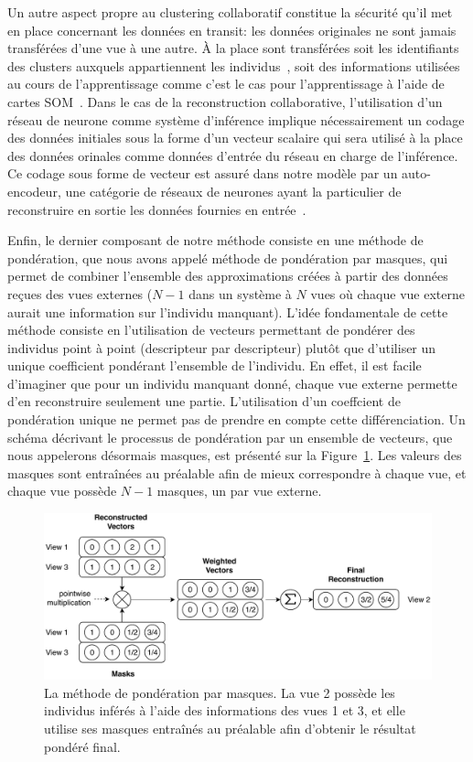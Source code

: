     Un autre aspect propre au clustering collaboratif constitue la sécurité qu'il met en place concernant les données en transit: les données originales ne sont jamais transférées d'une vue à une autre. À la place sont transférées soit les identifiants des clusters auxquels appartiennent les individus~\cite{sublime2016collaborative,Sublime2015}, soit des informations utilisées au cours de l'apprentissage comme c'est le cas pour l'apprentissage à l'aide de cartes SOM~\cite{ghassany2012collaborative,maurel2017incremental}. Dans le cas de la reconstruction collaborative, l'utilisation d'un réseau de neurone comme système d'inférence implique nécessairement un codage des données initiales sous la forme d'un vecteur scalaire qui sera utilisé à la place des données orinales comme données d'entrée du réseau en charge de l'inférence. Ce codage sous forme de vecteur est assuré dans notre modèle par un auto-encodeur, une catégorie de réseaux de neurones ayant la particulier de reconstruire en sortie les données fournies en entrée~\cite{vincent2008extracting}. 

    Enfin, le dernier composant de notre méthode consiste en une méthode de pondération, que nous avons appelé méthode de pondération par masques, qui permet de combiner l'ensemble des approximations créées à partir des données reçues des vues externes ($N-1$ dans un système à $N$ vues où chaque vue externe aurait une information sur l'individu manquant). L'idée fondamentale de cette méthode consiste en l'utilisation de vecteurs permettant de pondérer des individus point à point (descripteur par descripteur) plutôt que d'utiliser un unique coefficient pondérant l'ensemble de l'individu. En effet, il est facile d'imaginer que pour un individu manquant donné, chaque vue externe permette d'en reconstruire seulement une partie. L'utilisation d'un coeffcient de pondération unique ne permet pas de prendre en compte cette différenciation. Un schéma décrivant le processus de pondération par un ensemble de vecteurs, que nous appelerons désormais masques, est présenté sur la Figure~\ref{fig:sum_mwm}. Les valeurs des masques sont entraînées au préalable afin de mieux correspondre à chaque vue, et chaque vue possède $N-1$ masques, un par vue externe.

	\begin{figure}[h]
		\centering
		\includegraphics[width=\textwidth]{img/mwm.pdf}
        \caption{La méthode de pondération par masques. La vue 2 possède les individus inférés à l'aide des informations des vues 1 et 3, et elle utilise ses masques entraînés au préalable afin d'obtenir le résultat pondéré final.}
\label{fig:sum_mwm}
	\end{figure}

